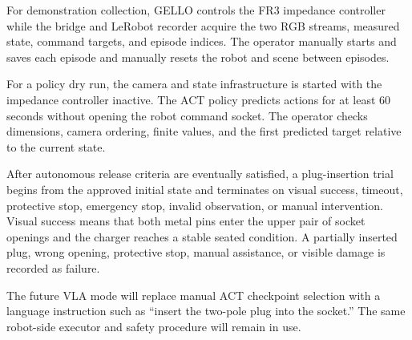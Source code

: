 \documentclass[12pt, letterpaper]{article}
\begin{document}
For demonstration collection, GELLO controls the FR3 impedance controller while the bridge and LeRobot recorder acquire the two RGB streams, measured state, command targets, and episode indices. The operator manually starts and saves each episode and manually resets the robot and scene between episodes.

For a policy dry run, the camera and state infrastructure is started with the impedance controller inactive. The ACT policy predicts actions for at least 60 seconds without opening the robot command socket. The operator checks dimensions, camera ordering, finite values, and the first predicted target relative to the current state.

After autonomous release criteria are eventually satisfied, a plug-insertion trial begins from the approved initial state and terminates on visual success, timeout, protective stop, emergency stop, invalid observation, or manual intervention. Visual success means that both metal pins enter the upper pair of socket openings and the charger reaches a stable seated condition. A partially inserted plug, wrong opening, protective stop, manual assistance, or visible damage is recorded as failure.

The future VLA mode will replace manual ACT checkpoint selection with a language instruction such as ``insert the two-pole plug into the socket.'' The same robot-side executor and safety procedure will remain in use.
\end{document}
